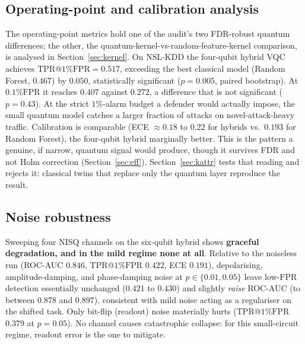 \documentclass[preprint,11pt]{elsarticle}
\newcommand{\tpr}{\mathrm{TPR}}
\newcommand{\fpr}{\mathrm{FPR}}
\begin{document}
\subsection{Operating-point and calibration analysis}\label{sec:op}
The operating-point metrics hold one of the audit's two FDR-robust quantum differences; the other, the
quantum-kernel-vs-random-feature-kernel comparison, is analysed in Section~\ref{sec:kernel}. On NSL-KDD the
four-qubit hybrid VQC achieves $\tpr$@$1\%\fpr=0.517$, exceeding the best classical model (Random Forest,
$0.467$) by $0.050$, statistically significant ($p=0.005$, paired bootstrap). At $0.1\%\fpr$ it reaches
$0.407$ against $0.272$, a difference that is not significant ($p=0.43$). At the strict $1\%$-alarm budget
a defender would actually impose, the small quantum model catches a larger fraction of attacks on
novel-attack-heavy traffic. Calibration is comparable (ECE $\approx 0.18$ to $0.22$ for hybrids vs.\ $0.193$
for Random Forest), the four-qubit hybrid marginally better. This is the pattern a genuine, if narrow, quantum signal would produce, though it survives FDR and not
Holm correction (Section~\ref{sec:eff}). Section~\ref{sec:kattr} tests that reading and rejects it:
classical twins that replace only the quantum layer reproduce the result.

\subsection{Noise robustness}
Sweeping four NISQ channels on the six-qubit hybrid shows \textbf{graceful degradation, and in the mild
regime none at all}. Relative to the noiseless run (ROC-AUC $0.846$, $\tpr$@$1\%\fpr$ $0.422$, ECE
$0.191$), depolarising, amplitude-damping, and phase-damping noise at $p\in\{0.01,0.05\}$ leave low-$\fpr$
detection essentially unchanged ($0.421$ to $0.430$) and slightly \emph{raise} ROC-AUC (to between
$0.878$ and $0.897$),
consistent with mild noise acting as a regulariser on the shifted task. Only bit-flip (readout) noise
materially hurts ($\tpr$@$1\%\fpr$ $0.379$ at $p=0.05$). No channel causes catastrophic collapse: for this
small-circuit regime, readout error is the one to mitigate.
\end{document}

